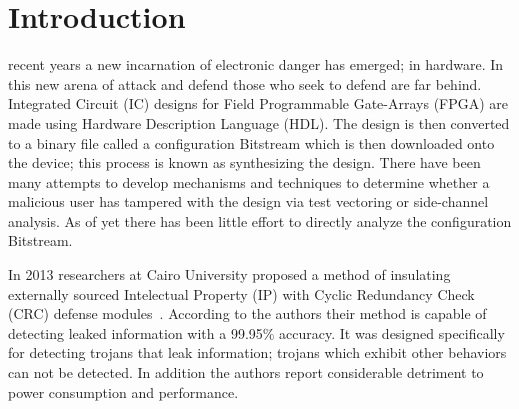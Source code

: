 \documentclass[journal, hidelinks]{IEEEtran}
\begin{document}
%
\IEEEpeerreviewmaketitle



\section{Introduction}
% 
% 
% 
% 
 recent years a new incarnation of electronic danger has emerged; in hardware.
In this new arena of attack and defend those who seek to defend are far behind.
Integrated Circuit (IC) designs for Field Programmable Gate-Arrays (FPGA) are made using Hardware Description Language (HDL).
The design is then converted to a binary file called a configuration Bitstream which is then downloaded onto the device; this process is known as synthesizing the design.
There have been many attempts to develop mechanisms and techniques to determine whether a malicious user has tampered with the design via test vectoring or side-channel analysis.
As of yet there has been little effort to directly analyze the configuration Bitstream.


In 2013 researchers at Cairo University proposed a method of insulating externally sourced Intelectual Property (IP) with Cyclic Redundancy Check (CRC) defense modules~\cite{crcDetection}.
According to the authors their method is capable of detecting leaked information with a 99.95\% accuracy.
It was designed specifically for detecting trojans that leak information; trojans which exhibit other behaviors can not be detected.
In addition the authors report considerable detriment to power consumption and performance.
\end{document}
